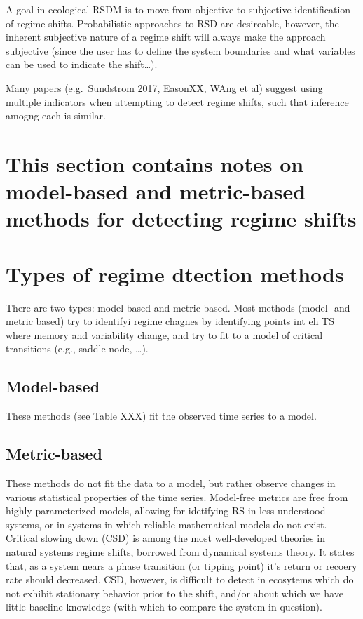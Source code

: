 \documentclass[12pt,twoside,openany]{reedthesis}
\begin{document}
A goal in ecological RSDM is to move from objective to subjective
identification of regime shifts. Probabilistic approaches to RSD are
desireable, however, the inherent subjective nature of a regime shift
will always make the approach subjective (since the user has to define
the system boundaries and what variables can be used to indicate the
shift\ldots{}).

Many papers (e.g.~Sundstrom 2017, EasonXX, WAng et al) suggest using
multiple indicators when attempting to detect regime shifts, such that
inference amogng each is similar.

\section{This section contains notes on model-based and metric-based
methods for detecting regime
shifts}\label{this-section-contains-notes-on-model-based-and-metric-based-methods-for-detecting-regime-shifts}

\section{Types of regime dtection
methods}\label{types-of-regime-dtection-methods}

There are two types: model-based and metric-based. Most methods (model-
and metric based) try to identifyi regime chagnes by identifying points
int eh TS where memory and variability change, and try to fit to a model
of critical transitions (e.g., saddle-node, \ldots{}).

\subsection{Model-based}\label{model-based}

These methods (see Table XXX) fit the observed time series to a model.

\subsection{Metric-based}\label{metric-based}

These methods do not fit the data to a model, but rather observe changes
in various statistical properties of the time series. Model-free metrics
are free from highly-parameterized models, allowing for idetifying RS in
less-understood systems, or in systems in which reliable mathematical
models do not exist. - Critical slowing down (CSD) is among the most
well-developed theories in natural systems regime shifts, borrowed from
dynamical systems theory. It states that, as a system nears a phase
transition (or tipping point) it's return or recoery rate should
decreased. CSD, however, is difficult to detect in ecosytems which do
not exhibit stationary behavior prior to the shift, and/or about which
we have little baseline knowledge (with which to compare the system in
question).
\end{document}
